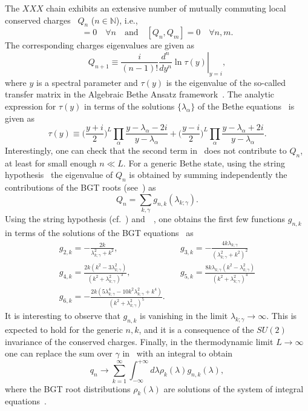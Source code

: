 \documentclass[11pt]{iopart}
\begin{document}
The $XXX$ chain exhibits an extensive number of mutually commuting local conserved 
charges~\cite{grabowski-1995} $Q_n$ ($n\in\mathbb{N}$), i.e., 
%
\begin{equation}
[Q_n,{\mathcal H}]=0\quad\forall n\quad\textrm{and}\quad [Q_n,Q_m]=0\quad\forall n,m.
\end{equation}
%
The corresponding charges eigenvalues are given as 
%
\begin{equation}
\label{Q-def}
\left.Q_{n+1}\equiv\frac{i}{(n-1)!}\frac{d^n}{dy^n}\ln\tau
(y)\right|_{y=i},
\end{equation}
%
where $y$ is a spectral parameter and $\tau(y)$ is the eigenvalue of the so-called 
transfer matrix in the Algebraic Bethe Ansatz framework~\cite{kor-book}. The analytic 
expression for $\tau(y)$ in terms of the solutions $\{\lambda_\alpha\}$ of the Bethe 
equations~ is given as 
%
\begin{equation}
\label{tau}
\tau(y)\equiv\Big(\frac{y+i}{2}\Big)^L\prod\limits_\alpha\frac{y-\lambda_\alpha-2i}
{y-\lambda_\alpha}+\Big(\frac{y-i}{2}\Big)^L\prod\limits_\alpha\frac{y-\lambda_\alpha
+2i}{y-\lambda_\alpha}.
\end{equation}
%
Interestingly, one can check that the second term in~ does not contribute to 
$Q_n$, at least for small enough $n\ll L$. For a generic Bethe state, using the string 
hypothesis~ the eigenvalue of $Q_n$ is obtained by summing 
independently the contributions of the BGT roots (see~) as 
%
\begin{equation}
\label{qngnk}
Q_n=\sum_{k,\gamma}g_{n,k}(\lambda_{k;\gamma}).
\end{equation}
%
Using the string hypothesis (cf.~) and~~, one obtains  
the first few functions $g_{n,k}$ in terms of the solutions of the BGT equations~ 
as 
%
\begin{eqnarray}
\label{gnk}
g_{2,k}=-\frac{2k}{\lambda^2_{k;\gamma}+k^2}, &\quad g_{3,k}=-\frac{4k\lambda_{k;\gamma}}
{(\lambda_{k;\gamma}^2+k^2)^2}\\\nonumber  
g_{4,k}=\frac{2k(k^2-3\lambda_{k;\gamma}^2)}{(k^2+\lambda_{k;\gamma}^2)^3}, &\quad 
g_{5,k}=\frac{8k\lambda_{k;\gamma}(k^2-\lambda_{k;\gamma}^2)}{(k^2+
\lambda_{k;\gamma}^2)^4}\\\nonumber
g_{6,k}=-\frac{2k(5\lambda_{k;\gamma}^4-10k^2\lambda_{k;\gamma}^2+k^4)}{(k^2+
\lambda_{k;\gamma}^2)^5}. 
\end{eqnarray}
%
It is interesting to observe that $g_{n,k}$ is vanishing in the limit $\lambda_{k;\gamma}\to\infty$. 
This is expected to hold for the generic $n,k$, and it is a consequence of the $SU(2)$ invariance 
of the conserved charges. Finally, in the thermodynamic limit $L\to\infty$ one can replace the 
sum over $\gamma$ in~ with an integral to obtain  
%
\begin{equation}
\label{q0-th}
q_n\to\sum_{k=1}^\infty\int_{-\infty}^{+\infty}d\lambda\rho_k(\lambda)g_{n,k}(\lambda), 
\end{equation}
%
where the BGT root distributions $\rho_k(\lambda)$ are solutions of the system of integral 
equations~. 
\end{document}
